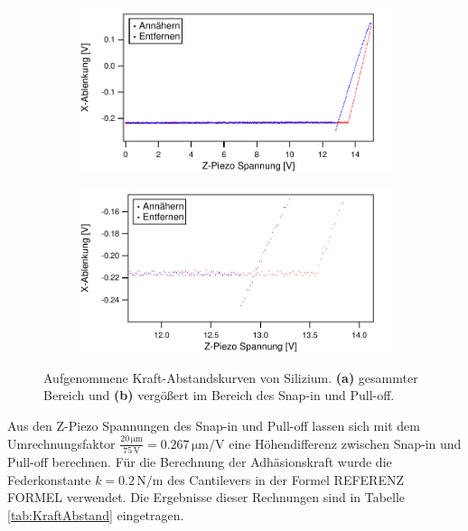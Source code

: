 \begin{figure}[H]
    \begin{subfigure}{0.8\textwidth}
        \includegraphics[width=\textwidth]{bilder/Kraft_Abstand/Si2.pdf}
        \caption{}
    \end{subfigure}
    \begin{subfigure}{0.8\textwidth}
        \includegraphics[width=\textwidth]{bilder/Kraft_Abstand/Si.pdf}
        \caption{}
    \end{subfigure}
    \caption{Aufgenommene Kraft-Abstandskurven von Silizium. \textbf{(a)} gesammter Bereich und \textbf{(b)} vergößert im Bereich des Snap-in und Pull-off.}
    \label{fig:Si}
\end{figure}
Aus den Z-Piezo Spannungen des Snap-in und Pull-off lassen sich mit dem Umrechnungsfaktor $\frac{20\,\si{\micro\meter}}{75\,\si{\volt}}=0.267\,\si{\micro\meter\per\volt}$ \cite{anleitung}
eine Höhendifferenz zwischen Snap-in und Pull-off berechnen. Für die Berechnung der Adhäsionskraft wurde die Federkonstante $k=0.2\,\si{\newton\per\meter}$ \cite{anleitung} des Cantilevers in der Formel REFERENZ FORMEL verwendet.
Die Ergebnisse dieser Rechnungen sind in Tabelle \ref{tab:KraftAbstand} eingetragen.

